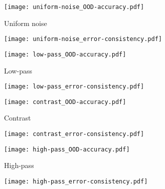 \begin{figure}
		\begin{subfigure}{\figwidth}
			\centering
			\texttt{[image: uniform-noise\_OOD-accuracy.pdf]}
			\vspace{\captionspace}
			\caption{Uniform noise}
			\vspace{\captionspaceII}
		\end{subfigure}\hfill
		\begin{subfigure}{\figwidth}
			\centering
			\texttt{[image: uniform-noise\_error-consistency.pdf]}
			\vspace{\captionspace}
			\caption*{}
			\vspace{\captionspaceII}
		\end{subfigure}\hfill
		\begin{subfigure}{\figwidth}
			\centering
			\texttt{[image: low-pass\_OOD-accuracy.pdf]}
			\vspace{\captionspace}
			\caption{Low-pass}
			\vspace{\captionspaceII}
		\end{subfigure}\hfill
		\begin{subfigure}{\figwidth}
			\centering
			\texttt{[image: low-pass\_error-consistency.pdf]}
			\vspace{\captionspace}
			\caption*{}
			\vspace{\captionspaceII}
		\end{subfigure}\hfill
		
		\begin{subfigure}{\figwidth}
			\centering
			\texttt{[image: contrast\_OOD-accuracy.pdf]}
			\vspace{\captionspace}
			\caption{Contrast}
			\vspace{\captionspaceII}
		\end{subfigure}\hfill
		\begin{subfigure}{\figwidth}
			\centering
			\texttt{[image: contrast\_error-consistency.pdf]}
			\vspace{\captionspace}
			\caption*{}
			\vspace{\captionspaceII}
		\end{subfigure}\hfill
		\begin{subfigure}{\figwidth}
			\centering
			\texttt{[image: high-pass\_OOD-accuracy.pdf]}
			\vspace{\captionspace}
			\caption{High-pass}
			\vspace{\captionspaceII}
		\end{subfigure}\hfill
		\begin{subfigure}{\figwidth}
			\centering
			\texttt{[image: high-pass\_error-consistency.pdf]}
			\vspace{\captionspace}
			\caption*{}
			\vspace{\captionspaceII}
		\end{subfigure}\hfill
	

\end{figure}
